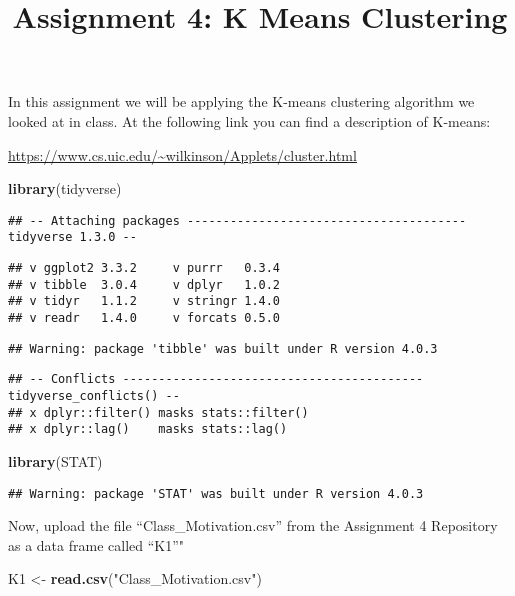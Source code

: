 \documentclass[
]{article}
\title{Assignment 4: K Means Clustering}
\author{}
\date{\vspace{-2.5em}}
\newenvironment{Shaded}{\begin{snugshade}}{\end{snugshade}}
\newcommand{\KeywordTok}[1]{\textcolor[rgb]{0.13,0.29,0.53}{\textbf{#1}}}
\newcommand{\NormalTok}[1]{#1}
\newcommand{\StringTok}[1]{\textcolor[rgb]{0.31,0.60,0.02}{#1}}
\begin{document}
\maketitle

In this assignment we will be applying the K-means clustering algorithm
we looked at in class. At the following link you can find a description
of K-means:

\url{https://www.cs.uic.edu/~wilkinson/Applets/cluster.html}

\begin{Shaded}
\begin{Highlighting}[]
\KeywordTok{library}\NormalTok{(tidyverse)}
\end{Highlighting}
\end{Shaded}

\begin{verbatim}
## -- Attaching packages --------------------------------------- tidyverse 1.3.0 --
\end{verbatim}

\begin{verbatim}
## v ggplot2 3.3.2     v purrr   0.3.4
## v tibble  3.0.4     v dplyr   1.0.2
## v tidyr   1.1.2     v stringr 1.4.0
## v readr   1.4.0     v forcats 0.5.0
\end{verbatim}

\begin{verbatim}
## Warning: package 'tibble' was built under R version 4.0.3
\end{verbatim}

\begin{verbatim}
## -- Conflicts ------------------------------------------ tidyverse_conflicts() --
## x dplyr::filter() masks stats::filter()
## x dplyr::lag()    masks stats::lag()
\end{verbatim}

\begin{Shaded}
\begin{Highlighting}[]
\KeywordTok{library}\NormalTok{(STAT)}
\end{Highlighting}
\end{Shaded}

\begin{verbatim}
## Warning: package 'STAT' was built under R version 4.0.3
\end{verbatim}

Now, upload the file ``Class\_Motivation.csv'' from the Assignment 4
Repository as a data frame called ``K1''"

\begin{Shaded}
\begin{Highlighting}[]
\NormalTok{K1 <-}\StringTok{ }\KeywordTok{read.csv}\NormalTok{(}\StringTok{"Class_Motivation.csv"}\NormalTok{)}
\end{Highlighting}
\end{Shaded}
\end{document}
